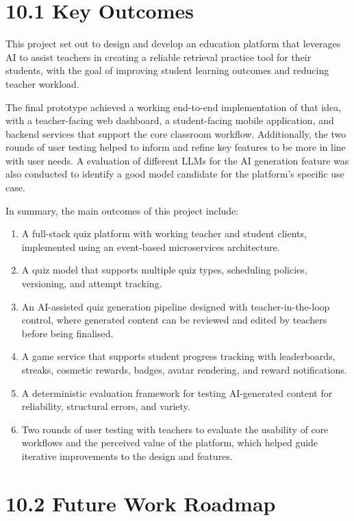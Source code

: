 \documentclass[
  12pt,
  a4paper,
]{report}
\providecommand{\tightlist}{%
  \setlength{\itemsep}{0pt}\setlength{\parskip}{0pt}}
\begin{document}
\hypertarget{key-outcomes}{%
\section{10.1 Key Outcomes}\label{key-outcomes}}

This project set out to design and develop an education platform that
leverages AI to assist teachers in creating a reliable retrieval
practice tool for their students, with the goal of improving student
learning outcomes and reducing teacher workload.

The final prototype achieved a working end-to-end implementation of that
idea, with a teacher-facing web dashboard, a student-facing mobile
application, and backend services that support the core classroom
workflow. Additionally, the two rounds of user testing helped
to inform and refine key features to be more in line with user needs.
A evaluation of different LLMs for the AI generation feature was also
conducted to identify a good model candidate for the platform's specific use case.

In summary, the main outcomes of this project include:
\begin{enumerate}
\def\labelenumi{\arabic{enumi}.}
\tightlist
\item
  A full-stack quiz platform with working teacher and student clients,
  implemented using an event-based microservices architecture.
\item
  A quiz model that supports multiple quiz types, scheduling policies,
  versioning, and attempt tracking.
\item
  An AI-assisted quiz generation pipeline designed with
  teacher-in-the-loop control, where generated content can be reviewed
  and edited by teachers before being finalised.
\item
  A game service that supports student progress tracking with
  leaderboards, streaks, cosmetic rewards, badges, avatar rendering, and
  reward notifications.
\item
  A deterministic evaluation framework for testing AI-generated content
  for reliability, structural errors, and variety.
\item
  Two rounds of user testing with teachers to evaluate the usability of
  core workflows and the perceived value of the platform, which helped guide
  iterative improvements to the design and features.
\end{enumerate}

\hypertarget{future-work-roadmap}{%
\section{10.2 Future Work Roadmap}\label{future-work-roadmap}}
\end{document}
